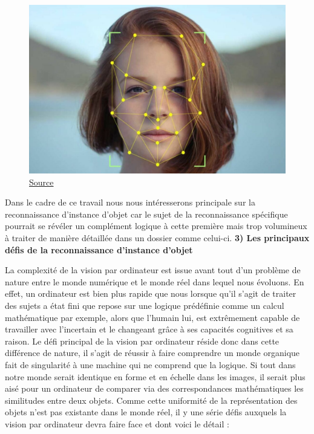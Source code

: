 \documentclass[a4paper,12pt]{article} %
\begin{document}
\begin{figure}[h] %
  \centering %
  \includegraphics[scale=0.45]{face.jpg} %
  \caption{\href{https://www.eu-startups.com/2020/12/facial-recognition-tech-risks-regulations-and-future-startup-opportunities-in-the-eu/}{Source} }
\end{figure}
\newline
\par
Dans le cadre de ce travail nous nous intéresserons principale sur la reconnaissance d’instance d’objet car le sujet de la reconnaissance spécifique pourrait se révéler un complément logique à cette première mais trop volumineux à traiter de manière détaillée dans un dossier comme celui-ci.
\newpage
\textbf{3) Les principaux défis de la reconnaissance d’instance d’objet}
\newline
\par
	La complexité de la vision par ordinateur est issue avant tout d’un problème de nature entre le monde numérique et le monde réel dans lequel nous évoluons. En effet, un ordinateur est bien plus rapide que nous lorsque qu’il s’agit de traiter des sujets a état fini que repose sur une logique prédéfinie comme un calcul mathématique par exemple, alors que l’humain lui, est extrêmement capable de travailler avec l’incertain et le changeant grâce à ses capacités cognitives et sa raison. Le défi principal de la vision par ordinateur réside donc dans cette différence de nature, il s’agit de réussir à faire comprendre un monde organique fait de singularité à une machine qui ne comprend que la logique. Si tout dans notre monde serait identique en forme et en échelle dans les images, il serait plus aisé pour un ordinateur de comparer via des correspondances mathématiques les similitudes entre deux objets. Comme cette uniformité de la représentation des objets n’est pas existante dans le monde réel, il y une série défis auxquels la vision par ordinateur devra faire face et dont voici le détail :\newline
\par
\end{document}
